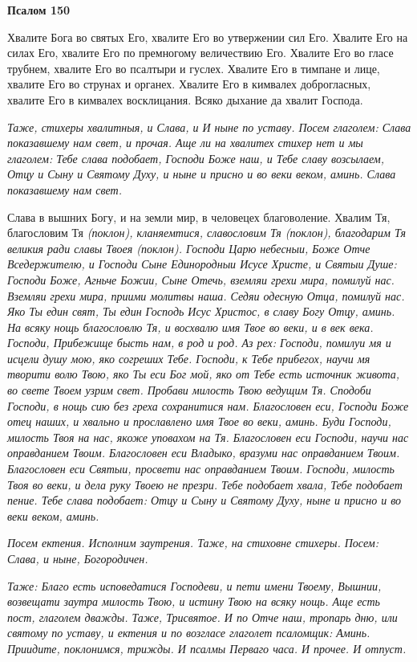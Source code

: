 \bfseries Псалом 150\normalfont{}


Хвалите Бога во святых Его, хвалите Его во утвержении сил Его. Хвалите Его на силах Его, хвалите Его по премногому величествию Его. Хвалите Его во гласе трубнем, хвалите Его во псалтыри и гуслех. Хвалите Его в тимпане и лице, хвалите Его во струнах и органех. Хвалите Его в кимвалех доброгласных, хвалите Его в кимвалех восклицания. Всяко дыхание да хвалит Господа.


\itshape Таже, стихеры хвалитныя, и Слава, и И ныне по уставу. Посем глаголем:\normalfont{} Слава показавшему нам свет, и прочая. Аще ли на хвалитех стихер нет и мы глаголем: Тебе слава подобает, Господи Боже наш, и Тебе славу возсылаем, Отцу и Сыну и Святому Духу, и ныне и присно и во веки веком, аминь. Слава показавшему нам свет.


Слава в вышних Богу, и на земли мир, в человецех благоволение. Хвалим Тя, благословим Тя \itshape (поклон)\normalfont{}, кланяемтися, славословим Тя \itshape (поклон)\normalfont{}, благодарим Тя великия ради славы Твоея \itshape (поклон)\normalfont{}. Господи Царю небесныи, Боже Отче Вседержителю, и Господи Сыне Единородныи Исусе Христе, и Святыи Душе: Господи Боже, Агньче Божии, Сыне Отечь, вземляи грехи мира, помилуй нас. Вземляи грехи мира, приими молитвы наша. Седяи одесную Отца, помилуй нас. Яко Ты един свят, Ты един Господь Исус Христос, в славу Богу Отцу, аминь. На всяку нощь благословлю Тя, и восхвалю имя Твое во веки, и в век века. Господи, Прибежище бысть нам, в род и род. Аз рех: Господи, помилуи мя и исцели душу мою, яко согреших Тебе. Господи, к Тебе прибегох, научи мя творити волю Твою, яко Ты еси Бог мой, яко от Тебе есть источник живота, во свете Твоем узрим свет. Пробави милость Твою ведущим Тя. Сподоби Господи, в нощь сию без греха сохранитися нам. Благословен еси, Господи Боже отец наших, и хвально и прославлено имя Твое во веки, аминь. Буди Господи, милость Твоя на нас, якоже уповахом на Тя. Благословен еси Господи, научи нас оправданием Твоим. Благословен еси Владыко, вразуми нас оправданием Твоим. Благословен еси Святыи, просвети нас оправданием Твоим. Господи, милость Твоя во веки, и дела руку Твоею не презри. Тебе подобает хвала, Тебе подобает пение. Тебе слава подобает: Отцу и Сыну и Святому Духу, ныне и присно и во веки веком, аминь.


\itshape Посем ектения.\normalfont{} Исполним заутрения. Таже, на стиховне стихеры. Посем: Слава, и ныне, Богородичен.


\itshape Таже:\normalfont{} Благо есть исповедатися Господеви, и пети имени Твоему, Вышнии, возвещати заутра милость Твою, и истину Твою на всяку нощь. Аще есть пост, глаголем дважды. Таже, Трисвятое. И по Отче наш, тропарь дню, или святому по уставу, и ектения и по возгласе глаголет псаломщик: Аминь. Приидите, поклонимся, трижды. И псалмы Перваго часа. И прочее. И отпуст.


